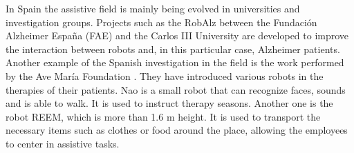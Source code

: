 In Spain the assistive field is mainly being evolved in universities and investigation groups. 
Projects such as the RobAlz between the Fundación Alzheimer España (FAE) and the Carlos III University \cite{robalz} are developed to improve the interaction between robots and, in this particular case, Alzheimer patients.  
Another example of the Spanish investigation in the field is the work performed by the Ave María Foundation \cite{assistive_spain}.
They have introduced various robots in the therapies of their patients. 
Nao is a small robot that can recognize faces, sounds and is able to walk. 
It is used to instruct therapy seasons. 
Another one is the robot REEM, which is more than 1.6 m height. 
It is used to transport the necessary items such as clothes or food around the place, allowing the employees to center in assistive tasks. 











